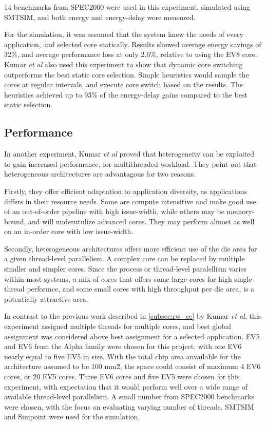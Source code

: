 14 benchmarks from SPEC2000 were used in this experiment, simulated using SMTSIM, and both energy and energy-delay were measured.

For the simulation, it was assumed that the system knew the needs of every application, and selected core statically. 
Results showed average energy savings of 32\%, and average performance loss at only 2.6\%, relative to using the EV8 core.
Kumar \textit{et al} also used this experiment to show that dynamic core switching outperforms the best static core selection.
Simple heuristics would sample the cores at regular intervals, and execute core switch based on the results.
The heuristics achieved up to 93\% of the energy-delay gains compared to the best static selection. 

\subsection{Performance}
\label{subsec:rw_perf}
In another experiment, Kumar \textit{et al}\cite{heterogeneous-perf} proved that heterogeneity can be exploited to gain increased performance, for multithreaded workload.
They point out that heterogeneous architectures are advantagous for two reasons.

Firstly, they offer efficient adaptation to application diversity, as applications differs in their resource needs.
Some are compute intensitive and make good use of an out-of-order pipeline with high issue-width, while others may be memory-bound, and will underutulize advanced cores.
They may perform almost as well on an in-order core with low issue-width\cite{heterogeneous-perf}.

Secondly, heterogeneous architectures offers more efficient use of the die area for a given thread-level parallelism.
A complex core can be replaced by multiple smaller and simpler cores. 
Since the process or thread-level paralellism varies within most systems, a mix of cores that offers some large cores for high single-thread performce, and some small cores with high throughput per die area, is a potentially attractive area. \cite{heterogeneous-perf}

In contrast to the previous work described in \ref{subsec:rw_ee} by Kumar \textit{et al}, this experiment assigned multiple threads for multiple cores, and best global assignment was considered above best assignment for a selected application.
EV5 and EV6 from the Alpha family were chosen for this project, with one EV6 nearly equal to five EV5 in size.
With the total chip area anvailable for the architecture assumed to be 100 mm\^2, the space could consist of maximum 4 EV6 cores, or 20 EV5 cores.
Three EV6 cores and five EV5 were chosen for this experiment, with expectation that it would perform well over a wide range of available thread-level parallelism. 
A small number from SPEC2000 benchmarks were chosen, with the focus on evaluating varying number of threads.
SMTSIM and Simpoint were used for the simulation.

